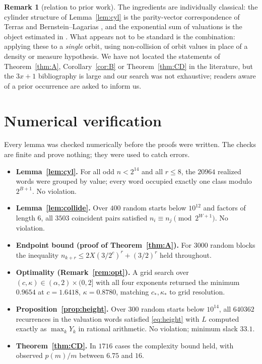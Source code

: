 \documentclass[11pt,reqno]{amsart}
\theoremstyle{plain}
\theoremstyle{definition}
\newtheorem{remark}[theorem]{Remark}
\numberwithin{equation}{section}
\begin{document}
\begin{remark}[relation to prior work]
The ingredients are individually classical: the cylinder structure of
Lemma~\ref{lem:cyl} is the parity-vector correspondence of Terras
\cite{terras1976} and Bernstein--Lagarias \cite{bernsteinlagarias1996}, and
the exponential sum of valuations is the object estimated in
\cite{tao2022}.  What appears not to be standard is the combination:
applying these to a \emph{single} orbit, using non-collision of orbit values
in place of a density or measure hypothesis.  We have not located the
statements of Theorem~\ref{thm:A}, Corollary~\ref{cor:B} or
Theorem~\ref{thm:CD} in the literature, but the $3x+1$ bibliography is large
\cite{lagarias1985} and our search was not exhaustive; readers aware of a
prior occurrence are asked to inform us.
\end{remark}

\appendix
\section{Numerical verification}
\label{app:numeric}

Every lemma was checked numerically before the proofs were written.  The
checks are finite and prove nothing; they were used to catch errors.

\begin{itemize}
  \item \textbf{Lemma~\ref{lem:cyl}.}  For all odd $n<2^{14}$ and all
        $r\le8$, the $\num{20964}$ realized words were grouped by value; every
        word occupied exactly one class modulo $2^{B+1}$.  No violation.
  \item \textbf{Lemma~\ref{lem:collide}.}  Over $400$ random starts below
        $10^{12}$ and factors of length $6$, all $\num{3503}$ coincident pairs
        satisfied $n_i\equiv n_j\pmod{2^{W+1}}$.  No violation.
  \item \textbf{Endpoint bound (proof of Theorem~\ref{thm:A}).}  For
        $\num{3000}$ random blocks the inequality
        $n_{k+r}\le2X(3/2^{c})^{r}+(3/2)^{r}$ held throughout.
  \item \textbf{Optimality (Remark~\ref{rem:opt}).}  A grid search over
        $(c,\kappa)\in(\alpha,2)\times(0,2]$ with all four exponents returned
        the minimum $0.9654$ at $c=1.6418$, $\kappa=0.8780$, matching
        $c_*,\kappa_*$ to grid resolution.
  \item \textbf{Proposition~\ref{prop:height}.}  Over $300$ random starts
        below $10^{14}$, all $\num{640362}$ recurrences in the valuation words
        satisfied \eqref{eq:height} with $L$ computed exactly as
        $\max_kY_k$ in rational arithmetic.  No violation; minimum slack
        $33.1$.
  \item \textbf{Theorem~\ref{thm:CD}.}  In $\num{1716}$ cases the complexity
        bound held, with observed $p(m)/m$ between $6.75$ and $16$.
\end{itemize}
\end{document}
